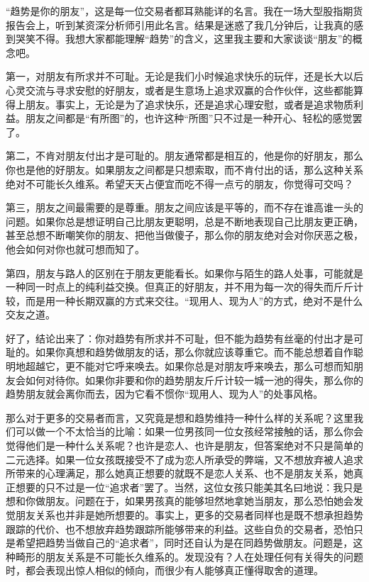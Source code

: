 “趋势是你的朋友”，这是每一位交易者都耳熟能详的名言。我在一场大型股指期货报告会上，听到某资深分析师引用此名言。结果是迷惑了我几分钟后，让我真的感到哭笑不得。我想大家都能理解“趋势”的含义，这里我主要和大家谈谈“朋友”的概念吧。

第一，对朋友有所求并不可耻。无论是我们小时候追求快乐的玩伴，还是长大以后心灵交流与寻求安慰的好朋友，或者是生意场上追求双赢的合作伙伴，这些都能算得上朋友。事实上，无论是为了追求快乐，还是追求心理安慰，或者是追求物质利益。朋友之间都是“有所图”的，也许这种“所图”只不过是一种开心、轻松的感觉罢了。

第二，不肯对朋友付出才是可耻的。朋友通常都是相互的，他是你的好朋友，那么你也是他的好朋友。如果朋友之间都是只想索取，而不肯付出的话，那么这种关系绝对不可能长久维系。希望天天占便宜而吃不得一点亏的朋友，你觉得可交吗？

第三，朋友之间最需要的是尊重。朋友之间应该是平等的，而不存在谁高谁一头的问题。如果你总是想证明自己比朋友更聪明，总是不断地表现自己比朋友更正确，甚至总想不断嘲笑你的朋友、把他当做傻子，那么你的朋友绝对会对你厌恶之极，他会如何对你也就可想而知了。

第四，朋友与路人的区别在于朋友更能看长。如果你与陌生的路人处事，可能就是一种同一时点上的纯利益交换。但真正的好朋友，并不用为每一次的得失而斤斤计较，而是用一种长期双赢的方式来交往。“现用人、现为人”的方式，绝对不是什么交友之道。

好了，结论出来了：你对趋势有所求并不可耻，但不能为趋势有丝毫的付出才是可耻的。如果你真想和趋势做朋友的话，那么你就应该尊重它。而不能总想着自作聪明地超越它，更不能对它呼来唤去。如果你总是对朋友呼来唤去，那么可想而知朋友会如何对待你。如果你非要和你的趋势朋友斤斤计较一城一池的得失，那么你的趋势朋友就会离你而去，因为它看不惯你“现用人、现为人”的处事风格。

那么对于更多的交易者而言，又究竟是想和趋势维持一种什么样的关系呢？这里我们可以做一个不太恰当的比喻：如果一位男孩同一位女孩经常接触的话，那么你会觉得他们是一种什么关系呢？也许是恋人、也许是朋友，但答案绝对不只是简单的二元选择。如果一位女孩既接受不了成为恋人所承受的弊端，又不想放弃被人追求所带来的心理满足，那么她真正想要的就既不是恋人关系、也不是朋友关系，她真正想要的只不过是一位“追求者”罢了。当然，这位女孩只能美其名曰地说：我只是想和你做朋友。问题在于，如果男孩真的能够坦然地拿她当朋友，那么恐怕她会发觉朋友关系也并非是她所想要的。事实上，更多的交易者同样也是既不想承担趋势跟踪的代价、也不想放弃趋势跟踪所能够带来的利益。这些自负的交易者，恐怕只是希望把趋势当做自己的“追求者”，同时还自认为是在同趋势做朋友。问题是，这种畸形的朋友关系是不可能长久维系的。发现没有？人在处理任何有关得失的问题时，都会表现出惊人相似的倾向，而很少有人能够真正懂得取舍的道理。


